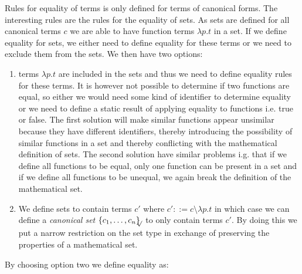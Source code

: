 \documentclass[a4paper]{article}
\newcommand{\s}[1]{\mathtt{#1}}
\newcommand{\sLb}{\s{\{}}
\newcommand{\sRb}{\s{\}}}
\newcommand{\sset}[1]{\sLb #1 \sRb}
\newcommand{\ssetc}[1]{\sset{#1}_{\!\!\!\surd}}
\begin{document}
Rules for equality of terms is only defined for terms of canonical forms. The interesting rules are the rules for the equality of sets. As sets are defined for all canonical terms $c$ we are able to have function terms $\lambda p.t$ in a set. If we define equality for sets, we either need to define equality for these terms or we need to exclude them from the sets. We then have two options:
\begin{enumerate}
\item terms $\lambda p.t$ are included in the sets and thus we need to define equality rules for these terms. It is however not possible to determine if two functions are equal, so either we would need some kind of identifier to determine equality or we need to define a static result of applying equality to functions i.e. true or false. The first solution will make similar functions appear unsimilar because they have different identifiers, thereby introducing the possibility of similar functions in a set and thereby conflicting with the mathematical definition of sets. The second solution have similar problems i.g. that if we define all functions to be equal, only one function can be present in a set and if we define all functions to be unequal, we again break the definition of the mathematical set.

\item We define sets to contain terms $c'$ where $c' ::= c \setminus \lambda p.t$ in which case we can define a \emph{canonical set} $\ssetc{c_1,\ldots,c_n}$ to only contain terms $c'$. By doing this we put a narrow restriction on the set type in exchange of preserving the properties of a mathematical set.
\end{enumerate}
By choosing option two we define equality as:
\end{document}
